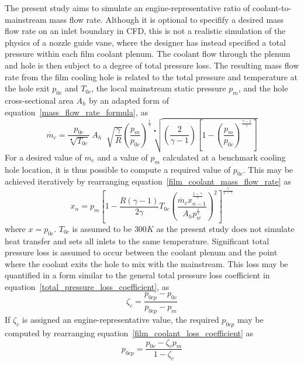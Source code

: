\documentclass[a4paper, 11pt, oneside]{report}
\begin{document}
The present study aims to simulate an engine-representative ratio of coolant-to-mainstream mass flow rate. Although it is optional to specifify a desired mass flow rate on an inlet boundary in CFD, this is not a realistic simulation of the physics of a nozzle guide vane, where the designer has instead specified a total pressure within each film coolant plenum. The coolant flow through the plenum and hole is then subject to a degree of total pressure loss. The resulting mass flow rate from the film cooling hole is related to the total pressure and temperature at the hole exit $p_{0c}$ and $T_{0c}$, the local mainstream static pressure $p_m$, and the hole cross-sectional area $A_h$ by an adapted form of equation~\ref{mass_flow_rate_formula}, as
\begin{equation}\label{film_coolant_mass_flow_rate}
\dot{m_c} =
\frac{p_{0c}}{\sqrt[•]{T_{0c}}} \>
A_h \;
\sqrt[]{\frac{\gamma}{R}}
\left(
    \frac{p_m}{p_{0c}}
\right)^\frac{1}{\gamma}
\sqrt[•]{
	\left(
		\frac{2}{\gamma - 1}  
	\right)
	\left[
		1 - \left( \frac{p_m}{p_{0c}} \right)^\frac{\gamma-1}{\gamma}
	\right] 
}
\end{equation}
For a desired value of $m_c$ and a value of $p_m$ calculated at a benchmark cooling hole location, it is thus possible to compute a required value of $p_{0c}$. This may be achieved iteratively by rearranging equation~\ref{film_coolant_mass_flow_rate} as
\begin{equation}
x_n =
p_m
\left[
	1-
	\frac{
		R\left(\gamma-1\right)
	}{
		2\gamma
	}
	T_{0c}
	\left(
		\frac{
			\dot{m_c}
			x_{n-1}^{\frac{1-\gamma}{\gamma}}
		}{
			A_h
			p_w^{\frac{1}{\gamma}}
		}
	\right)
	^2
\right]
^{\frac{\gamma}{1-\gamma}}
\end{equation}
where $x=p_{0c}$. $T_{0c}$ is assumed to be $300 K$ as the present study does not simulate heat transfer and sets all inlets to the same temperature. Significant total pressure loss is assumed to occur between the coolant plenum and the point where the coolant exits the hole to mix with the mainstream. This loss may be quantified in a form similar to the general total pressure loss coefficient in equation~\ref{total_pressure_loss_coefficient}, as
\begin{equation}\label{film_coolant_loss_coefficient}
\zeta_c = 
\frac{
p_{0cp} - p_{0c}
}{
p_{0cp} - p_m
}
\end{equation}
If $\zeta_c$ is assigned an engine-representative value, the required $p_{0cp}$ may be computed by rearranging equation~\ref{film_coolant_loss_coefficient} as
\begin{equation}
p_{0cp} =
\frac{
	p_{0c} - \zeta_c p_m
}{
	1 - \zeta_c
}
\end{equation}
\end{document}

